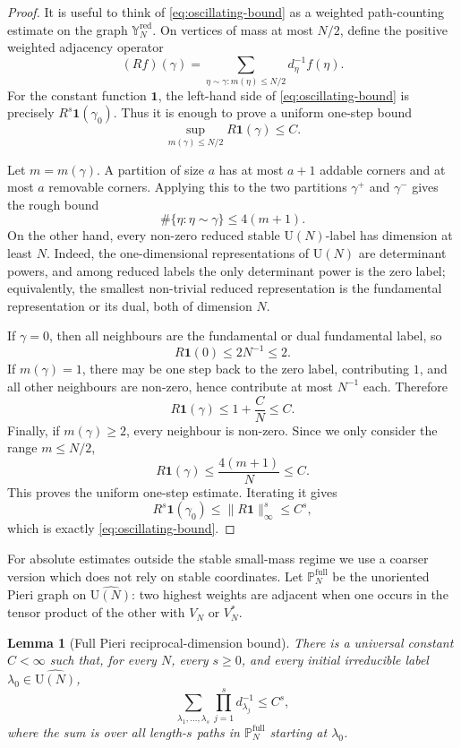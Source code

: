 \documentclass[11pt,a4paper,reqno]{amsart}
\newtheorem{lemma}[theorem]{Lemma}
\theoremstyle{definition}
\theoremstyle{remark}
\newcommand\U{{\mathrm U}}
\begin{document}
\begin{proof}
It is useful to think of \eqref{eq:oscillating-bound} as a weighted path-counting estimate on the graph $\mathbb Y_N^{\mathrm{red}}$.  On vertices of mass at most $N/2$, define the positive weighted adjacency operator
\[
(Rf)(\gamma)=\sum_{\eta\sim\gamma : m(\eta)\le N/2}d_\eta^{-1} f(\eta).
\]
For the constant function $\mathbf 1$, the left-hand side of \eqref{eq:oscillating-bound} is precisely $R^s\mathbf 1(\gamma_0).$ Thus it is enough to prove a uniform one-step bound
\[
\sup_{m(\gamma)\le N/2} R\mathbf 1(\gamma)\le C.
\]

Let $m=m(\gamma)$.  A partition of size $a$ has at most $a+1$ addable corners and at most $a$ removable corners.  Applying this to the two partitions $\gamma^+$ and $\gamma^-$ gives the rough bound
\[
\#\{\eta:\eta\sim\gamma\}\le 4(m+1).
\]
On the other hand, every non-zero reduced stable $\U(N)$-label has dimension at least $N$.  Indeed, the one-dimensional representations of $\U(N)$ are determinant powers, and among reduced labels the only determinant power is the zero label; equivalently, the smallest non-trivial reduced representation is the fundamental representation or its dual, both of dimension $N$.

If $\gamma=0$, then all neighbours are the fundamental or dual fundamental label, so
\[
R\mathbf 1(0)\le 2N^{-1}\le 2.
\]
If $m(\gamma)=1$, there may be one step back to the zero label, contributing $1$, and all other neighbours are non-zero, hence contribute at most $N^{-1}$ each.  Therefore
\[
R\mathbf 1(\gamma)\le 1+\frac{C}{N}\le C.
\]
Finally, if $m(\gamma)\ge 2$, every neighbour is non-zero.  Since we only consider the range $m\le N/2$,
\[
R\mathbf 1(\gamma)
\le
\frac{4(m+1)}{N}
\le C.
\]
This proves the uniform one-step estimate.  Iterating it gives
\[
R^s\mathbf 1(\gamma_0)
\le
\|R\mathbf 1\|_\infty^s
\le C^s,
\]
which is exactly \eqref{eq:oscillating-bound}.
\end{proof}

For absolute estimates outside the stable small-mass regime we use a coarser version which does not rely on stable coordinates.  Let $\mathbb P_N^{\mathrm{full}}$ be the unoriented Pieri graph on $\widehat{\U(N)}$: two highest weights are adjacent when one occurs in the tensor product of the other with $V_N$ or $V_N^*$.

\begin{lemma}[Full Pieri reciprocal-dimension bound]\label{lem:full-pieri-path}
There is a universal constant $C<\infty$ such that, for every $N$, every $s\ge0$, and every initial irreducible label $\lambda_0\in\widehat{\U(N)}$,
\begin{equation}\label{eq:full-pieri-path}
\sum_{\lambda_1,\ldots,\lambda_s}
\prod_{j=1}^s d_{\lambda_j}^{-1}
\le C^s,
\end{equation}
where the sum is over all length-$s$ paths in $\mathbb P_N^{\mathrm{full}}$ starting at $\lambda_0$.
\end{lemma}
\end{document}
